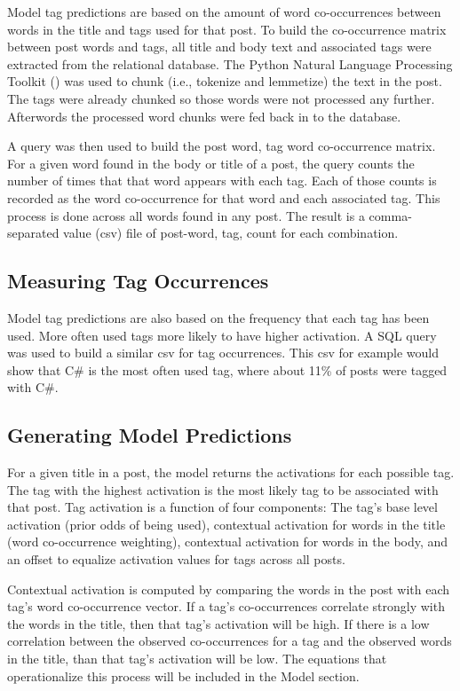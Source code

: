 \documentclass[10pt,letterpaper]{article}
\begin{document}
Model tag predictions are based on the amount of word co-occurrences between words in the title and tags used for that post.
To build the co-occurrence matrix between post words and tags, all title and body text and associated tags were extracted from the relational database.
The Python Natural Language Processing Toolkit (\cite{Bird2009}) was used to chunk (i.e., tokenize and lemmetize) the text in the post.
The tags were already chunked so those words were not processed any further.
Afterwords the processed word chunks were fed back in to the database.

A query was then used to build the post word, tag word co-occurrence matrix.
For a given word found in the body or title of a post, the query counts the number of times that that word appears with each tag.
Each of those counts is recorded as the word co-occurrence for that word and each associated tag.
This process is done across all words found in any post.
The result is a comma-separated value (csv) file of post-word, tag, count for each combination.

\subsection{Measuring Tag Occurrences}

Model tag predictions are also based on the frequency that each tag has been used.
More often used tags more likely to have higher activation.
A SQL query was used to build a similar csv for tag occurrences.
This csv for example would show that C\# is the most often used tag, where about 11\% of posts were tagged with C\#.

\subsection{Generating Model Predictions}

For a given title in a post, the model returns the activations for each possible tag.
The tag with the highest activation is the most likely tag to be associated with that post.
Tag activation is a function of four components:
The tag's base level activation (prior odds of being used),
contextual activation for words in the title (word co-occurrence weighting),
contextual activation for words in the body,
and an offset to equalize activation values for tags across all posts.

Contextual activation is computed by comparing the words in the post with each tag's word co-occurrence vector.
If a tag's co-occurrences correlate strongly with the words in the title, then that tag's activation will be high.
If there is a low correlation between the observed co-occurrences for a tag and the observed words in the title, than that tag's activation will be low.
The equations that operationalize this process will be included in the Model section.
\end{document}
